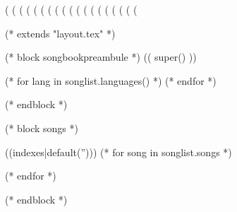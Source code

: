 (%
(%
(%
(%
(%
(%
(%
(%
(%
(%
(%
(%
(%
(%
(%
(%
(%
(%
(%


(* extends "layout.tex" *)

(* block songbookpreambule *)
   (( super() ))


   (* for lang in songlist.languages() *)
   (* endfor *)
   \usepackage[((lang))]{babel}

   \graphicspath{{((datadir))/img/}}
(* endblock *)

(* block songs *)

   \begin{songs}{((indexes|default('')))}
      (* for song in songlist.songs *)
      
      (* endfor *)
   \end{songs}
(* endblock *)
